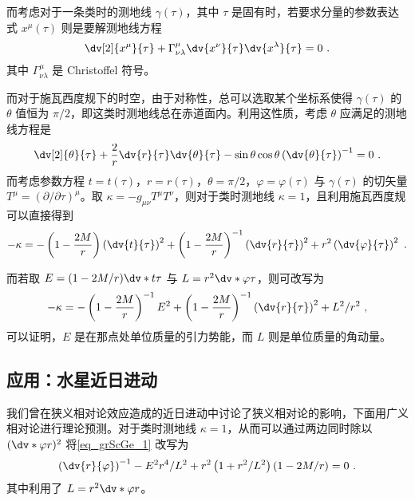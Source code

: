 而考虑对于一条类时的测地线 $\gamma(\tau)$，其中 $\tau$ 是固有时，若要求分量的参数表达式 $x^\mu(\tau)$ 则是要解测地线方程
\begin{equation}
\dv[2]{x^\mu}{\tau} + \Gamma^{\mu}_{\nu \lambda} \dv{x^\nu}{\tau} \dv{x^\lambda}{\tau} = 0~.
\end{equation}
其中 $\Gamma^\mu_{\nu \lambda}$ 是 Christoffel 符号。

而对于施瓦西度规下的时空，由于对称性，总可以选取某个坐标系使得 $\gamma(\tau)$ 的 $\theta$ 值恒为 $\pi/2$，即这类时测地线总在赤道面内。利用这性质，考虑 $\theta$ 应满足的测地线方程是
\begin{equation}
\dv[2]{\theta}{\tau} + \frac{2}{r} \dv{r}{\tau} \dv{\theta}{\tau} - \sin \theta \cos \theta \left(\dv{\theta}{\tau}\right)^{-1} = 0 ~.
\end{equation}
而考虑参数方程 $t = t(\tau)$，$r = r(\tau)$，$\theta = \pi/2$，$\varphi = \varphi(\tau)$ 与 $\gamma(\tau)$ 的切矢量 $T^\mu = (\partial/\partial \tau)^\mu$。取 $\kappa = -g_{\mu\nu} T^\mu T^\nu$，则对于类时测地线 $\kappa = 1$，且利用施瓦西度规可以直接得到
\begin{equation}
-\kappa = -\left(1 - \frac{2M}{r}\right)\left(\dv{t}{\tau}\right)^2 + \left(1-\frac{2M}{r}\right)^{-1} \left(\dv{r}{\tau}\right)^2 + r^2 \left(\dv{\varphi}{\tau}\right)^2 ~.
\end{equation}

而若取 $E = (1-2M/r) \dv*{t}{\tau}$ 与 $L = r^2 \dv*{\varphi}{\tau}$，则可改写为
\begin{equation}\label{eq_grScGe_1}
-\kappa = -\left(1-\frac{2M}{r}\right)^{-1} E^2  + \left(1-\frac{2M}{r}\right)^{-1} \left(\dv{r}{\tau}\right)^2 + L^2/r^2 ~,
\end{equation}
可以证明，$E$ 是在那点处单位质量的引力势能，而 $L$ 则是单位质量的角动量。

\subsection{应用：水星近日进动}\label{sub_grScGe_1}
我们曾在狭义相对论效应造成的近日进动中讨论了狭义相对论的影响，下面用广义相对论进行理论预测。对于类时测地线 $\kappa = 1$，从而可以通过两边同时除以 $(\dv*{\varphi}{r})^2$ 将\autoref{eq_grScGe_1} 改写为
\begin{equation}
\left( \dv{r}{\varphi} \right)^{-1} - E^2r^4/L^2 + r^2 \left( 1+r^2/L^2 \right)\left(1 - 2M/r\right) = 0 ~.
\end{equation}
其中利用了 $L = r^2 \dv*{\varphi}{r}$。

